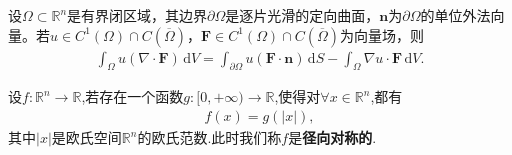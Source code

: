 \documentclass[../../main.tex]{subfiles}%
\begin{document}
\begin{theorem}[多元函数分部积分公式]\label{theorem:多元函数分部积分公式}
设$\Omega\subset\mathbb{R}^n$是有界闭区域，其边界$\partial\Omega$是逐片光滑的定向曲面，$\bm{n}$为$\partial\Omega$的单位外法向量。若$u\in C^1(\Omega)\cap C(\overline{\Omega})$，$\bm{F}\in C^1(\Omega)\cap C(\overline{\Omega})$为向量场，则
\begin{align*}
\int_{\Omega}u(\nabla\cdot\bm{F})\,\mathrm{d}V=\int_{\partial\Omega}u(\bm{F}\cdot\bm{n})\,\mathrm{d}S-\int_{\Omega}\nabla u\cdot\bm{F}\,\mathrm{d}V. 
\end{align*}
\end{theorem}

\begin{definition}[径向对称函数]
设$f:\mathbb{R}^n\to \mathbb{R}$,若存在一个函数$g:[0,+\infty)\to \mathbb{R}$,使得对$\forall x\in \mathbb{R}^n$,都有
\begin{align*}
f(x)=g(|x|),
\end{align*}
其中$|x|$是欧氏空间$\mathbb{R}^n$的欧氏范数.此时我们称$f$是\textbf{径向对称的}.
\end{definition}
\end{document}
